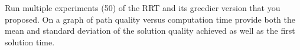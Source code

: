 \question{[15]}

Run multiple experiments (50) of the RRT and its greedier version that you
proposed. On a graph of path quality versus computation time provide both
the mean and standard deviation of the solution quality achieved as well as
the first solution time.